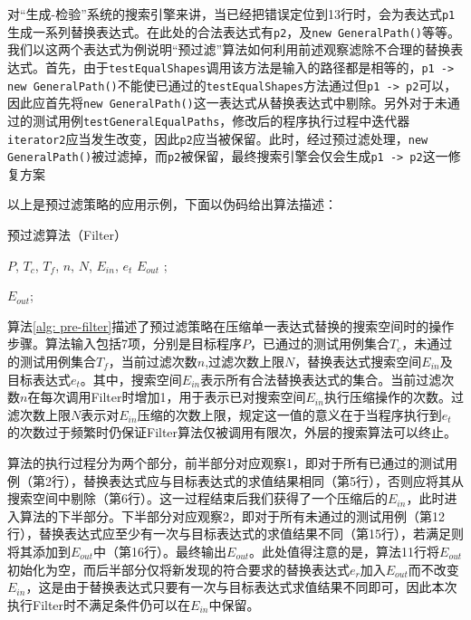 对“生成-检验”系统的搜索引擎来讲，当已经把错误定位到13行时，会为表达式\texttt{p1}生成一系列替换表达式。在此处的合法表达式有\texttt{p2}，及\texttt{new GeneralPath()}等等。我们以这两个表达式为例说明“预过滤”算法如何利用前述观察滤除不合理的替换表达式。首先，由于\texttt{testEqualShapes}调用该方法是输入的路径都是相等的，\texttt{p1 -> new GeneralPath()}不能使已通过的\texttt{testEqualShapes}方法通过但\texttt{p1 -> p2}可以，因此应首先将\texttt{new GeneralPath()}这一表达式从替换表达式中剔除。另外对于未通过的测试用例\texttt{testGeneralEqualPaths}，修改后的程序执行过程中迭代器\texttt{iterator2}应当发生改变，因此\texttt{p2}应当被保留。此时，经过预过滤处理，\texttt{new GeneralPath()}被过滤掉，而\texttt{p2}被保留，最终搜索引擎会仅会生成\texttt{p1 -> p2}这一修复方案

以上是预过滤策略的应用示例，下面以伪码给出算法描述：


\begin{algorithm}
	\caption{预过滤算法（Filter）}
	\label{alg: pre-filter}
	\begin{algorithmic}[1]
		\renewcommand{\algorithmicrequire}{\textbf{Input:}}
		\renewcommand\algorithmicensure {\textbf{Output:} }
		\REQUIRE $P$, $T_c$, $T_f$, $n$, $N$, $E_{in}$, $e_t$
		\ENSURE $E_{out}$
						;
					\ENDIF
				\ENDFOR
			\ENDWHILE
		\ENDFOR
		
					\ENDIF
				\ENDFOR
			\ENDWHILE
		\ENDFOR		
		\RETURN $E_{out}$;
		
	\end{algorithmic}
\end{algorithm}

算法\ref{alg: pre-filter}描述了预过滤策略在压缩单一表达式替换的搜索空间时的操作步骤。算法输入包括7项，分别是目标程序$P$，已通过的测试用例集合$T_c$，未通过的测试用例集合$T_f$，当前过滤次数$n$,过滤次数上限$N$，替换表达式搜索空间$E_{in}$及目标表达式$e_t$。其中，搜索空间$E_{in}$表示所有合法替换表达式的集合。当前过滤次数$n$在每次调用Filter时增加1，用于表示已对搜索空间$E_{in}$执行压缩操作的次数。过滤次数上限$N$表示对$E_{in}$压缩的次数上限，规定这一值的意义在于当程序执行到$e_t$的次数过于频繁时仍保证Filter算法仅被调用有限次，外层的搜索算法可以终止。

算法的执行过程分为两个部分，前半部分对应观察1，即对于所有已通过的测试用例（第2行），替换表达式应与目标表达式的求值结果相同（第5行），否则应将其从搜索空间中剔除（第6行）。这一过程结束后我们获得了一个压缩后的$E_{in}$，此时进入算法的下半部分。下半部分对应观察2，即对于所有未通过的测试用例（第12行），替换表达式应至少有一次与目标表达式的求值结果不同（第15行），若满足则将其添加到$E_{out}$中（第16行）。最终输出$E_{out}$。此处值得注意的是，算法11行将$E_{out}$初始化为空，而后半部分仅将新发现的符合要求的替换表达式$e_r$加入$E_{out}$而不改变$E_{in}$，这是由于替换表达式只要有一次与目标表达式求值结果不同即可，因此本次执行Filter时不满足条件仍可以在$E_{in}$中保留。

